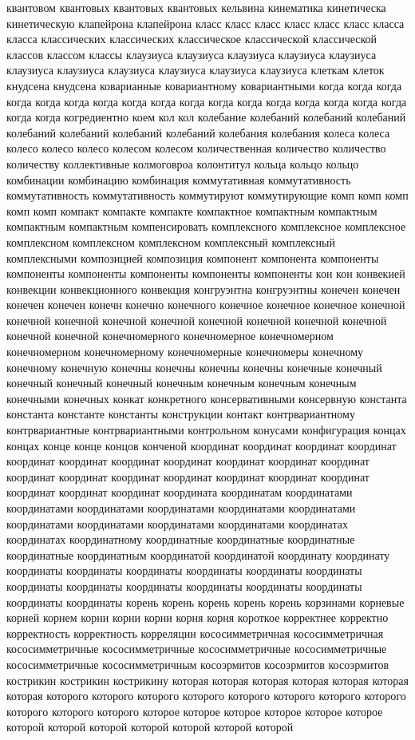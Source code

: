 квантовом квантовых квантовых квантовых кельвина кинематика кинетическа кинетическую клапейрона клапейрона класс класс класс класс класс класс класса класса классических классических классическое классической классической классов классом классы клаузиуса клаузиуса клаузиуса клаузиуса клаузиуса клаузиуса клаузиуса клаузиуса клаузиуса клаузиуса клаузиуса клеткам клеток кнудсена кнудсена коварианные ковариантному ковариантными когда когда когда когда когда когда когда когда когда когда когда когда когда когда когда когда когда когда когда когредиентно коем кол кол колебание колебаний колебаний колебаний колебаний колебаний колебаний колебаний колебания колебания колеса колеса колесо колесо колесо колесом колесом количественная количество количество количеству коллективные колмоговроа колонтитул кольца кольцо кольцо комбинации комбинацию комбинация коммутативная коммутативность коммутативность коммутативность коммутируют коммутирующие комп комп комп комп комп компакт компакте компакте компактное компактным компактным компактным компактным компенсировать комплексного комплексное комплексное комплексном комплексном комплексном комплексный комплексный комплексными композицией композиция компонент компонента компоненты компоненты компоненты компоненты компоненты компоненты кон кон конвекией конвекции конвекционного конвекция конгруэнтна конгруэнтны конечен конечен конечен конечен конечн конечно конечного конечное конечное конечное конечной конечной конечной конечной конечной конечной конечной конечной конечной конечной конечной конечномерного конечномерное конечномерном конечномерном конечномерному конечномерные конечномеры конечному конечному конечную конечны конечны конечны конечны конечные конечный конечный конечный конечный конечным конечным конечным конечным конечными конечных конкат конкретного консервативными консервную константа константа константе константы конструкции контакт контрвариантному контрвариантные контрвариантными контрольном конусами конфигурация концах концах конце конце концов конченой координат координат координат координат координат координат координат координат координат координат координат координат координат координат координат координат координат координат координат координат координат координата координатам координатами координатами координатами координатами координатами координатами координатами координатами координатами координатами координатах координатах координатному координатные координатные координатные координатные координатным координатой координатой координату координату координаты координаты координаты координаты координаты координаты координаты координаты координаты координаты координаты координаты координаты координаты корень корень корень корень корень корзинами корневые корней корнем корни корни корни корня корня короткое корректнее корректно корректность корректность корреляции кососимметричная кососимметричная кососимметричные кососимметричные кососимметричные кососимметричные кососимметричные кососимметричным косоэрмитов косоэрмитов косоэрмитов кострикин кострикин кострикину которая которая которая которая которая которая которая которого которого которого которого которого которого которого которого которого которого которого которое которое которое которое которое которое которой которой которой которой которой которой которой 